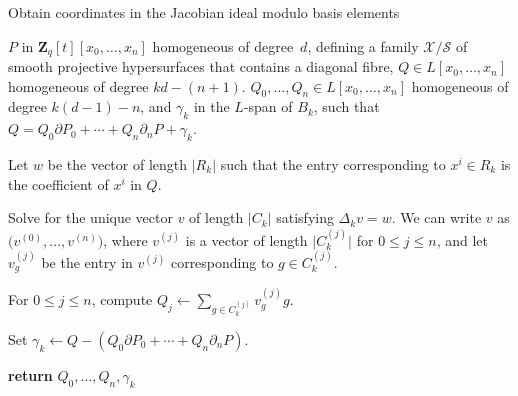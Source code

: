 \documentclass[a4paper,11pt]{article}
\numberwithin{equation}{section}
\providecommand{\abs}[1]{\lvert#1\rvert}                 %
\newcommand{\ZZ}{\mathbf{Z}} %
\theoremstyle{definition}
\begin{document}
\begin{algorithm}
\caption{Obtain coordinates in the Jacobian ideal modulo basis elements}
\label{alg:Decompose}
\begin{algorithmic}
\Require $P$ in $\ZZ_q[t][x_0, \dotsc, x_n]$ homogeneous of degree~$d$, 
         defining a family $\mathcal{X}/\mathcal{S}$ of smooth projective 
         hypersurfaces that contains a diagonal fibre, 
         $Q \in L[x_0, \dotsc, x_n]$ homogeneous of degree $kd - (n+1)$.
\Ensure  $Q_0, \dotsc, Q_n \in L[x_0, \dotsc, x_n]$ homogeneous of degree 
         $k(d-1)-n$, and $\gamma_k$ in the $L$-span of $B_k$, such that 
         $Q = Q_0 \partial P_0 + \dotsb + Q_n \partial_n P +\gamma_k$.
\State \begin{compactenum}[{\hspace{1em}} 1.] \vspace{-1.24em}
\item Let $w$ be the vector of length $\abs{R_k}$ such that the entry 
      corresponding to $x^i \in R_k$ is the coefficient of 
      $x^i$ in $Q$.
\item Solve for the unique vector $v$ of length $\abs{C_k}$ satisfying 
      $\Delta_k v = w$.  We can write $v$ 
      as $\bigl(v^{(0)}, \dotsc, v^{(n)}\bigr)$, where $v^{(j)}$ is 
      a vector of length $\abs{C_k^{(j)}}$ for $0 \leq j \leq n$,
      and let $v_g^{(j)}$ be the entry in $v^{(j)}$ corresponding 
      to $g \in C_k^{(j)}$.
\item For $0 \leq j \leq n$, compute $Q_j \gets \sum_{g \in C_k^{(j)}} v_g^{(j)} g$.
\item Set $\gamma_k \gets Q-(Q_0 \partial P_0 + \dotsb + Q_n \partial_n P)$.
\item \textbf{return} $Q_0, \dotsc, Q_n,\gamma_k$      
\EndProcedure
\end{compactenum}
\end{algorithmic}
\end{algorithm}
\end{document}
